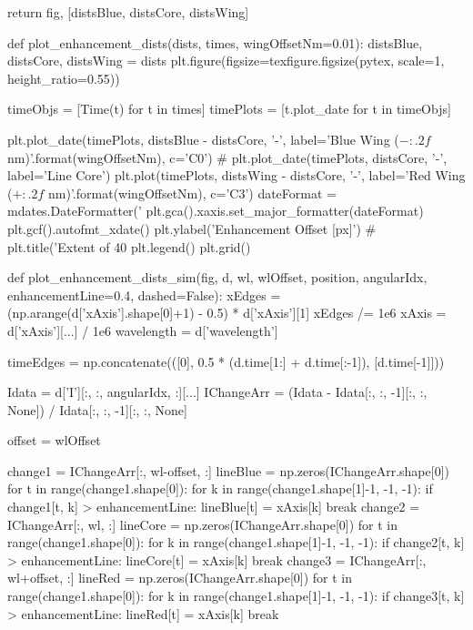 \begin{pycode}[2DRT]
    return fig, [distsBlue, distsCore, distsWing]

def plot_enhancement_dists(dists, times, wingOffsetNm=0.01):
    distsBlue, distsCore, distsWing = dists
    plt.figure(figsize=texfigure.figsize(pytex, scale=1, height_ratio=0.55))

    timeObjs = [Time(t) for t in times]
    timePlots = [t.plot_date for t in timeObjs]

    plt.plot_date(timePlots, distsBlue - distsCore, '-', label='Blue Wing ($-{:.2f}$ nm)'.format(wingOffsetNm), c='C0')
    # plt.plot_date(timePlots, distsCore, '-', label='Line Core')
    plt.plot(timePlots, distsWing - distsCore, '-', label='Red Wing ($+{:.2f}$ nm)'.format(wingOffsetNm), c='C3')
    dateFormat = mdates.DateFormatter('%
    plt.gca().xaxis.set_major_formatter(dateFormat)
    plt.gcf().autofmt_xdate()
    plt.ylabel('Enhancement Offset [px]')
#     plt.title('Extent of 40%
    plt.legend()
    plt.grid()

def plot_enhancement_dists_sim(fig, d, wl, wlOffset, position,
                               angularIdx, enhancementLine=0.4, dashed=False):
    xEdges = (np.arange(d['xAxis'].shape[0]+1) - 0.5) * d['xAxis'][1]
    xEdges /= 1e6
    xAxis = d['xAxis'][...] / 1e6
    wavelength = d['wavelength']

    timeEdges = np.concatenate(([0],
                                0.5 * (d.time[1:] + d.time[:-1]),
                                [d.time[-1]]))

    Idata = d['I'][:, :, angularIdx, :][...]
    IChangeArr = (Idata - Idata[:, :, -1][:, :, None]) / Idata[:, :, -1][:, :, None]

    offset = wlOffset

    change1 = IChangeArr[:, wl-offset, :]
    lineBlue = np.zeros(IChangeArr.shape[0])
    for t in range(change1.shape[0]):
        for k in range(change1.shape[1]-1, -1, -1):
            if change1[t, k] > enhancementLine:
                lineBlue[t] = xAxis[k]
                break
    change2 = IChangeArr[:, wl, :]
    lineCore = np.zeros(IChangeArr.shape[0])
    for t in range(change1.shape[0]):
        for k in range(change1.shape[1]-1, -1, -1):
            if change2[t, k] > enhancementLine:
                lineCore[t] = xAxis[k]
                break
    change3 = IChangeArr[:, wl+offset, :]
    lineRed = np.zeros(IChangeArr.shape[0])
    for t in range(change1.shape[0]):
        for k in range(change1.shape[1]-1, -1, -1):
            if change3[t, k] > enhancementLine:
                lineRed[t] = xAxis[k]
                break


\end{pycode}
